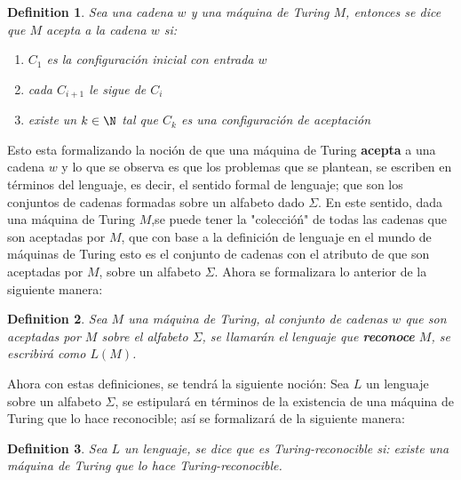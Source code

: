 \documentclass[10pt]{report}
\newtheorem{definition}{Definition}
\begin{document}
    \begin{definition}
        Sea una cadena $w$ y una máquina de Turing $M$,\newline
        entonces se dice que $M$ acepta a la cadena $w$ si:
        \begin{enumerate}
            \item $C_{1}$ es la configuración inicial con entrada $w$
            \item cada $C_{i+1}$ le sigue de $C_{i}$
            \item existe un $k \in \N$ tal que $C_{k}$ es una configuración de aceptación
        \end{enumerate}
    \end{definition}
    Esto esta formalizando la noción de que una máquina de Turing \textbf{acepta} a una cadena $w$
    y lo que se observa es que los problemas que se plantean, se
    escriben en términos del lenguaje, es decir, el sentido formal de lenguaje; que son los
    conjuntos de cadenas formadas sobre un alfabeto dado $\Sigma$.
    \newpage
    En este sentido, dada una máquina de Turing $M$,se puede tener la "coleccióń" de todas
    las cadenas que son aceptadas por $M$, que con base a la definición de lenguaje en el mundo de máquinas de Turing
    esto es el conjunto de cadenas con el atributo de que son aceptadas por $M$, sobre un alfabeto $\Sigma$.
    \newline
    Ahora se formalizara lo anterior de la siguiente manera:
    \begin{definition}
        Sea $M$ una máquina de Turing, al conjunto de cadenas $w$ que son aceptadas por $M$ sobre el alfabeto $\Sigma$,
        se llamarán el lenguaje que \textbf{reconoce} $M$, se escribirá como $L(M)$.

    \end{definition}
    \newline
    Ahora con estas definiciones, se tendrá la siguiente noción: \newline Sea $L$ un lenguaje sobre un alfabeto $\Sigma$,
    se estipulará en términos de la existencia de una máquina de Turing que lo hace reconocible;
    así se formalizará de la siguiente manera: \newline

    \begin{definition}
        Sea $L$ un lenguaje, se dice que es Turing-reconocible si:
        existe una máquina de Turing que lo hace Turing-reconocible.
    \end{definition}
\end{document}
